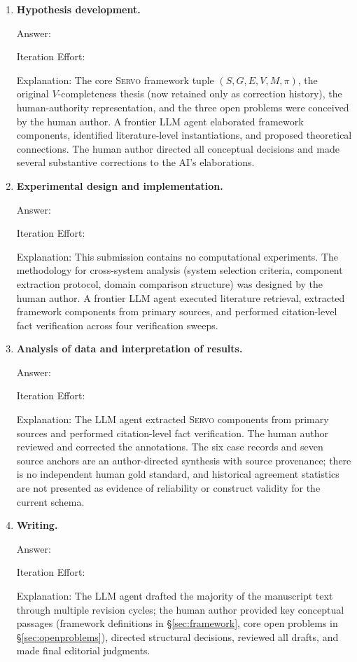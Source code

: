 \documentclass{article}
\newcommand{\sgmvpi}{$(S, G, E, V, M, \pi)$}
\newcommand{\framework}{\textsc{Servo}}
\begin{document}
\begin{enumerate}

  \item \textbf{Hypothesis development.}

    Answer: \involvementB{}

    Iteration Effort: \iterationMedium{}

    Explanation: The core \framework{} framework tuple \sgmvpi{}, the original $V$-completeness thesis (now retained only as correction history), the human-authority representation, and the three open problems were conceived by the human author. A frontier LLM agent elaborated framework components, identified literature-level instantiations, and proposed theoretical connections. The human author directed all conceptual decisions and made several substantive corrections to the AI's elaborations.

  \item \textbf{Experimental design and implementation.}

    Answer: \involvementB{}

    Iteration Effort: \iterationMedium{}

    Explanation: This submission contains no computational experiments. The methodology for cross-system analysis (system selection criteria, component extraction protocol, domain comparison structure) was designed by the human author. A frontier LLM agent executed literature retrieval, extracted framework components from primary sources, and performed citation-level fact verification across four verification sweeps.

  \item \textbf{Analysis of data and interpretation of results.}

    Answer: \involvementC{}

    Iteration Effort: \iterationMedium{}

    Explanation: The LLM agent extracted \framework{} components from primary sources and performed citation-level fact verification. The human author reviewed and corrected the annotations. The six case records and seven source anchors are an author-directed synthesis with source provenance; there is no independent human gold standard, and historical agreement statistics are not presented as evidence of reliability or construct validity for the current schema.

  \item \textbf{Writing.}

    Answer: \involvementC{}

    Iteration Effort: \iterationHigh{}

    Explanation: The LLM agent drafted the majority of the manuscript text through multiple revision cycles; the human author provided key conceptual passages (framework definitions in \S\ref{sec:framework}, core open problems in \S\ref{sec:openproblems}), directed structural decisions, reviewed all drafts, and made final editorial judgments.

\end{enumerate}
\end{document}
